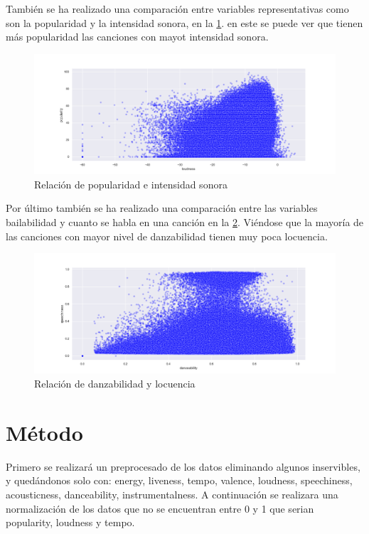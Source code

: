 \documentclass{wsdcr}
\begin{document}
También se ha realizado una comparación entre variables representativas como son la popularidad y la intensidad sonora, en la \figurename{\ref*{fig:relacion popularidad e intensidad sonora}}. en este se puede ver que tienen más popularidad las canciones con mayot intensidad sonora.

\begin{figure}[h!] \includegraphics[width=\columnwidth]{images/popularity_loudness_scatterplot.png} \caption{Relación de popularidad e intensidad sonora} \label{fig:relacion popularidad e intensidad sonora} \end{figure}

Por último también se ha realizado una comparación entre las variables bailabilidad y cuanto se habla en una canción en la \figurename{\ref*{fig:relacion danzabilidad y locuencia}}. Viéndose que la mayoría de las canciones con mayor nivel de danzabilidad tienen muy poca locuencia.

\begin{figure}[h!] \includegraphics[width=\columnwidth]{images/danceability_speechiness_scatterplot.png} \caption{Relación de danzabilidad y locuencia} \label{fig:relacion danzabilidad y locuencia} \end{figure}

\section{Método}
Primero se realizará un preprocesado de los datos eliminando algunos inservibles, y quedándonos solo con: energy, liveness, tempo, valence, loudness, speechiness, acousticness, danceability, instrumentalness. A continuación se realizara una normalización de los datos que no se encuentran entre 0 y 1 que serian popularity, loudness y tempo.
\end{document}

